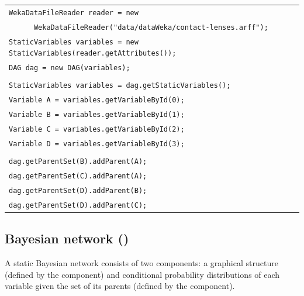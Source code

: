 \begin{table}[H]
\begin{tabular}{l} \\ \hline

        \texttt{WekaDataFileReader reader = new}\\
         \texttt{~~~~~~WekaDataFileReader("data/dataWeka/contact-lenses.arff");}\\

        \texttt{StaticVariables variables = new StaticVariables(reader.getAttributes());}\\
        \texttt{DAG dag = new DAG(variables);}\\\\

        \texttt{StaticVariables variables = dag.getStaticVariables();}\\
        \texttt{Variable A = variables.getVariableById(0);}\\
        \texttt{Variable B = variables.getVariableById(1);}\\
        \texttt{Variable C = variables.getVariableById(2);}\\
        \texttt{Variable D = variables.getVariableById(3);}\\ \\ 

        \texttt{dag.getParentSet(B).addParent(A);}\\
        \texttt{dag.getParentSet(C).addParent(A);}\\
        \texttt{dag.getParentSet(D).addParent(B);}\\
        \texttt{dag.getParentSet(D).addParent(C);}\\ \hline 

\end{tabular}
\end{table}


\subsection{Bayesian network ()}

A static Bayesian network consists of two components: a graphical structure (defined by the  component) and conditional probability distributions of each variable given the set of its parents (defined by the  component).

